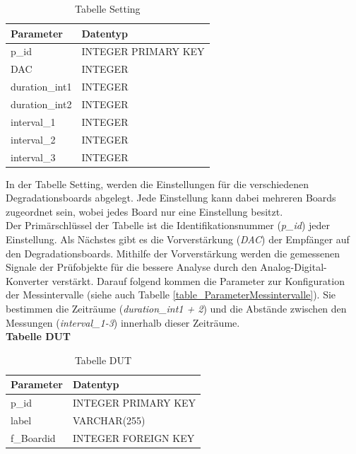 \begin{table}[H]
\begin{center}
\begin{tabular}{|l|l|}\hline
Parameter & Datentyp \\ \hline
p\_id & INTEGER PRIMARY KEY\\ 
DAC & INTEGER\\ 
duration\_int1 & INTEGER\\ 
duration\_int2 & INTEGER\\ 
interval\_1 & INTEGER\\ 
interval\_2 & INTEGER\\ 
interval\_3 & INTEGER\\ \hline
\end{tabular}
\caption{Tabelle Setting}
\label{table_TabelleSetting}
\end{center}
\end{table}

In der Tabelle Setting, werden die Einstellungen  für die verschiedenen Degradationsboards abgelegt. Jede Einstellung kann dabei mehreren Boards zugeordnet sein, wobei jedes Board nur eine Einstellung besitzt.\\
Der Primärschlüssel der Tabelle ist die Identifikationsnummer (\textit{p\_id}) jeder Einstellung. Als Nächstes gibt es die Vorverstärkung (\textit{DAC}) der Empfänger auf den Degradationsboards. Mithilfe der Vorverstärkung werden die gemessenen Signale der Prüfobjekte für die bessere Analyse durch den Analog-Digital-Konverter verstärkt. Darauf folgend kommen die Parameter zur Konfiguration der Messintervalle (siehe auch Tabelle \ref{table_ParameterMessintervalle}). Sie bestimmen die Zeiträume (\textit{duration\_int1 + 2}) und die Abstände zwischen den Messungen (\textit{interval\_1-3}) innerhalb dieser Zeiträume.\\

\textbf{Tabelle DUT}\\

\begin{table}[H]
\begin{center}
\begin{tabular}{|l|l|}\hline
Parameter & Datentyp \\ \hline
p\_id & INTEGER PRIMARY KEY\\ 
label & VARCHAR(255)\\ 
f\_Boardid & INTEGER FOREIGN KEY\\ \hline
\end{tabular}
\caption{Tabelle DUT}
\label{table_TabelleDUT}
\end{center}
\end{table}

